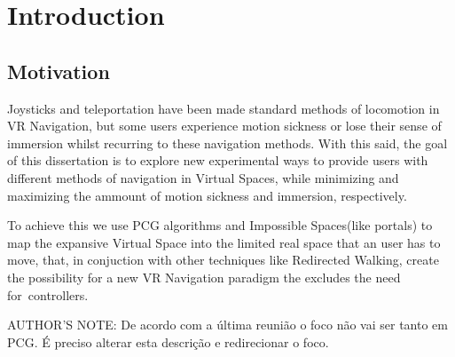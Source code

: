 
%

\chapter{Introduction}     
\label{cha:introduction}


\epigraphfontsize{\small\itshape}
\setlength\epigraphwidth{12.5cm}
\setlength\epigraphrule{0pt}

\section{Motivation}
Joysticks and teleportation have been made standard methods of locomotion in VR Navigation, but  some users experience motion sickness or lose their sense of immersion whilst recurring to these navigation methods. With this said, the goal of this dissertation is to explore new experimental ways to provide users with different methods of navigation in Virtual Spaces, while minimizing and maximizing the ammount of motion sickness and immersion, respectively.

To achieve this we use PCG algorithms and Impossible Spaces(like portals) to map the expansive Virtual Space into the limited real space that an user has to move, that, in conjuction with other techniques like Redirected Walking, create the possibility for a new VR Navigation paradigm the excludes the need for controllers.

AUTHOR'S NOTE: De acordo com a última reunião o foco não vai ser tanto em PCG. É preciso alterar esta descrição e redirecionar o foco. 

\newcommand{\Overleaf}{\href{https://www.overleaf.com?r=f5160636&rm=d&rs=b}{Overleaf}}

